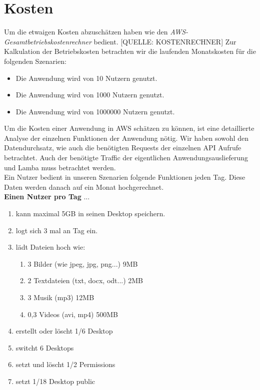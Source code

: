 \documentclass[a4paper, 12pt]{scrreprt}
\renewcommand\_{\textunderscore\allowbreak}
\begin{document}
\section{Kosten}
Um die etwaigen Kosten abzuschätzen haben wie den \textit{AWS-Gesamtbetriebskostenrechner} bedient. [QUELLE: KOSTENRECHNER] 
\noindent Zur Kalkulation der Betriebskosten betrachten wir die laufenden Monatskosten für die folgenden Szenarien:\\
\begin{itemize}
\item Die Anwendung wird von 10 Nutzern genutzt.
\item Die Anwendung wird von 1000 Nutzern genutzt.
\item Die Anwendung wird von 1000000 Nutzern genutzt.
\end{itemize}
Um die Kosten einer Anwendung in AWS schätzen zu können, ist eine detaillierte Analyse der einzelnen Funktionen der Anwendung nötig. Wir haben sowohl den Datendurchsatz, wie auch die benötigten Requests der einzelnen API Aufrufe betrachtet. Auch der benötigte Traffic der eigentlichen Anwendungsauslieferung und Lamba muss betrachtet werden.\\ 
Ein Nutzer bedient in unseren Szenarien folgende Funktionen jeden Tag. Diese Daten werden danach auf ein Monat hochgerechnet. \\
\textbf{Einen Nutzer pro Tag} ...
\begin{enumerate}
\item kann maximal 5GB in seinen Desktop speichern.
\item logt sich 3 mal an Tag ein.
\item lädt Dateien hoch wie:
\begin{enumerate}
\item 3 Bilder (wie jpeg, jpg, png...) 9MB
\item 2 Textdateien (txt, docx, odt...) 2MB
\item 3 Musik (mp3) 12MB
\item 0,3 Videos (avi, mp4) 500MB
\end{enumerate}
\item erstellt oder löscht 1/6 Desktop
\item switcht 6 Desktops
\item setzt und löscht 1/2 Permissions
\item setzt 1/18 Desktop public
\end{enumerate}
\end{document}
